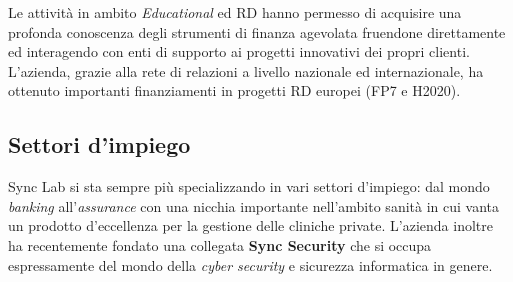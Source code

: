 Le attività in ambito \textit{Educational} ed RD hanno permesso di acquisire una profonda
conoscenza degli strumenti di finanza agevolata fruendone direttamente ed interagendo
con enti di supporto ai progetti innovativi dei propri clienti. L'azienda, grazie alla rete
di relazioni a livello nazionale ed internazionale, ha ottenuto importanti finanziamenti
in progetti RD europei (FP7 e H2020).

\subsection{Settori d'impiego}

Sync Lab si sta sempre più specializzando in vari settori d'impiego: dal mondo \textit{banking}
all'\textit{assurance} con una nicchia importante nell'ambito sanità in cui vanta un prodotto
d'eccellenza per la gestione delle cliniche private.
L'azienda inoltre ha recentemente fondato una collegata \textbf{Sync Security} che si occupa
espressamente del mondo della \textit{cyber security} e sicurezza informatica in genere.


